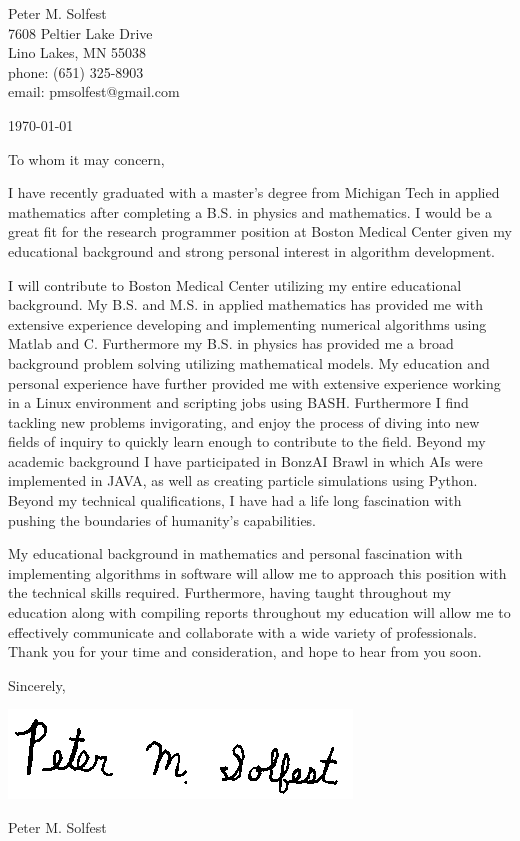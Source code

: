 \documentclass[letterpaper,12pt]{article}
\begin{document}
Peter M. Solfest\\
7608 Peltier Lake Drive\\
Lino Lakes, MN 55038\\
phone: (651) 325-8903\\
email: pmsolfest@gmail.com

\today

To whom it may concern,

I have recently graduated with a master's degree from Michigan Tech in applied mathematics after
completing a B.S. in physics and mathematics.
I would be a great fit for the research programmer position
at Boston Medical Center given my educational background
and strong personal interest in algorithm development.

I will contribute to Boston Medical Center utilizing my entire educational background.
My B.S. and M.S. in applied mathematics has provided me with extensive experience developing
and implementing numerical algorithms using Matlab and C.
Furthermore my B.S. in physics has provided me a broad background
problem solving utilizing mathematical models.
My education and personal experience have further provided me with
extensive experience working in a Linux environment and scripting
jobs using BASH.
Furthermore I find tackling new problems invigorating, and enjoy
the process of diving into new fields of inquiry to quickly learn
enough to contribute to the field.
Beyond my academic background I have participated in BonzAI Brawl in which
AIs were implemented in JAVA, as well as
creating particle simulations using Python.
%
Beyond my technical qualifications, I have had a life long fascination with
pushing the boundaries of humanity's capabilities.

My educational background in mathematics and personal fascination
with implementing algorithms in software will allow 
me to approach this position with the technical skills required.
Furthermore, having taught throughout my education along with compiling reports
throughout my education will allow me to effectively communicate and
collaborate with a wide variety of professionals.
Thank you for your time and consideration, and hope to hear from you soon.


Sincerely,

\includegraphics[height=.5in]{signature.png}

Peter M. Solfest
\end{document}
